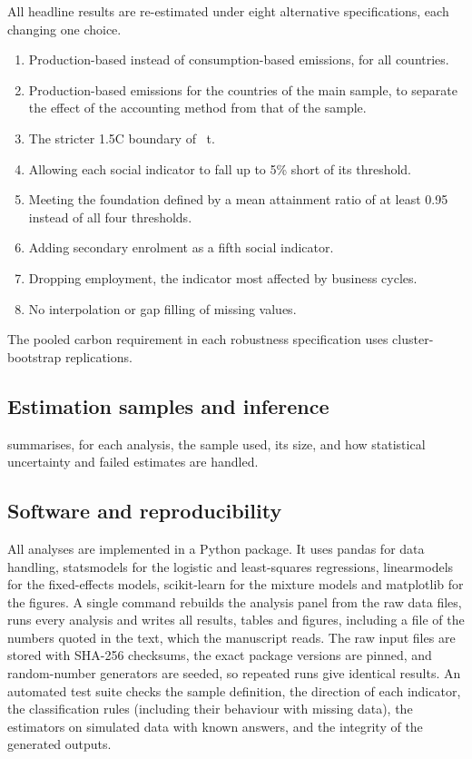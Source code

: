All headline results are re-estimated under eight alternative specifications, each changing one choice.
\begin{enumerate}
\item Production-based instead of consumption-based emissions, for all \nNCountries{} countries.
\item Production-based emissions for the \nNCons{} countries of the main sample, to separate the effect of the accounting method from that of the sample.
\item The stricter 1.5\textdegree C boundary of \nBoundaryFifteen~t.
\item Allowing each social indicator to fall up to 5\% short of its threshold.
\item Meeting the foundation defined by a mean attainment ratio of at least 0.95 instead of all four thresholds.
\item Adding secondary enrolment as a fifth social indicator.
\item Dropping employment, the indicator most affected by business cycles.
\item No interpolation or gap filling of missing values.
\end{enumerate}
The pooled carbon requirement in each robustness specification uses \nRobReps{} cluster-bootstrap replications.

\subsection{Estimation samples and inference}

 summarises, for each analysis, the sample used, its size, and how statistical uncertainty and failed estimates are handled.



\subsection{Software and reproducibility}

All analyses are implemented in a Python package. It uses pandas for data handling, statsmodels for the logistic and least-squares regressions, linearmodels for the fixed-effects models, scikit-learn for the mixture models and matplotlib for the figures. A single command rebuilds the analysis panel from the raw data files, runs every analysis and writes all results, tables and figures, including a file of the numbers quoted in the text, which the manuscript reads. The raw input files are stored with SHA-256 checksums, the exact package versions are pinned, and random-number generators are seeded, so repeated runs give identical results. An automated test suite checks the sample definition, the direction of each indicator, the classification rules (including their behaviour with missing data), the estimators on simulated data with known answers, and the integrity of the generated outputs.
